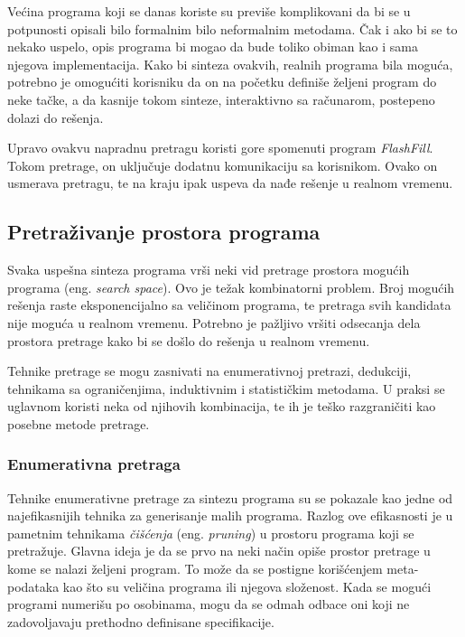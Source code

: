 Većina programa koji se danas koriste su previše komplikovani da bi se u potpunosti opisali bilo formalnim bilo neformalnim metodama. Čak i ako bi se to nekako uspelo, opis programa bi mogao da bude toliko obiman kao i sama njegova implementacija. Kako bi sinteza ovakvih, realnih programa bila moguća, potrebno je omogućiti korisniku da on na početku definiše željeni program do neke tačke, a da kasnije tokom sinteze, interaktivno sa računarom, postepeno dolazi do rešenja.

Upravo ovakvu napradnu pretragu koristi gore spomenuti program \emph{FlashFill}. Tokom pretrage, on uključuje dodatnu komunikaciju sa korisnikom. Ovako on usmerava pretragu, te na kraju ipak uspeva da nađe rešenje u realnom vremenu.


\subsection{Pretraživanje prostora programa}
\label{subsec:ProstorPrograma}

Svaka uspešna sinteza programa vrši neki vid pretrage prostora mo\-gu\-ćih programa (eng. \emph{search space}). Ovo je težak kombinatorni problem. Broj mogućih rešenja raste eksponencijalno sa veličinom programa, te pretraga svih kandidata nije moguća u realnom vremenu. Potrebno je pažljivo vršiti odsecanja dela prostora pretrage kako bi se došlo do rešenja u realnom vremenu.

Tehnike pretrage se mogu zasnivati na enumerativnoj pretrazi, dedukciji, tehnikama sa ograničenjima, induktivnim i statističkim metodama. U praksi se uglavnom koristi neka od njihovih kombinacija, te ih je teško razgraničiti kao posebne metode pretrage.


\subsubsection{Enumerativna pretraga}
\label{subsubsec:Enumerative}

Tehnike enumerativne pretrage za sintezu programa su se pokazale kao jedne od najefikasnijih tehnika za generisanje malih programa. Razlog ove efikasnosti je u pametnim tehnikama \emph{čišćenja} (eng. \emph{pruning}) u prostoru programa koji se pretražuje. Glavna ideja je da se prvo na neki način opiše prostor pretrage u kome se nalazi željeni program. To može da se postigne korišćenjem meta-podataka kao što su veličina programa ili njegova složenost. Kada se mogući programi numerišu po osobinama, mogu da se odmah odbace oni koji ne zadovoljavaju prethodno definisane specifikacije.

